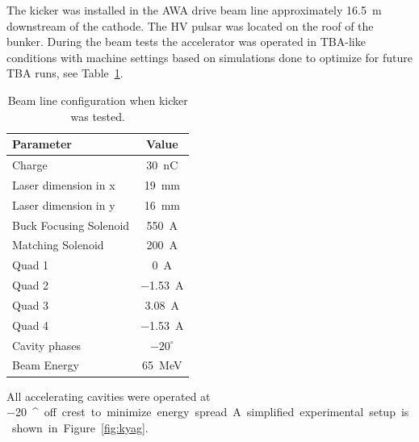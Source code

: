 \documentclass[aps,prab,preprint,groupedaddress,linenumbers]{revtex4-2}
\begin{document}
The kicker was installed in the AWA drive beam line approximately \SI{16.5}{m} downstream of the cathode.
The HV pulsar was located on the roof of the bunker.
During the beam tests the accelerator was operated in TBA-like conditions with machine settings based on simulations 
done to optimize for future TBA runs, see Table~\ref{tab:krunparam}.
\begin{table}%
	\begin{center}
		\caption{Beam line configuration when kicker was tested.}
		\label{tab:krunparam}
		\begin{tabular}{lc}
			\toprule
			\toprule
			\textbf{Parameter} 		&  \textbf{Value} \\ 
			\midrule
			Charge					&  \SI{30}{nC} \\
			Laser dimension in x    &  \SI{19}{mm} \\
			Laser dimension in y    &  \SI{16}{mm} \\
			Buck Focusing Solenoid	& \SI{550}{A} \\
			Matching Solenoid		& \SI{200}{A} \\
			Quad 1					& \SI{0}{A}  \\
			Quad 2					& \SI{-1.53}{A}  \\
			Quad 3					& \SI{3.08}{A}  \\
			Quad 4					& \SI{-1.53}{A}  \\
			Cavity phases   		& $-20^\circ$ \\
			Beam Energy 				& \SI{65}{MeV}\\ 
			\bottomrule
		\end{tabular}
	\end{center}
\end{table}
All accelerating cavities were operated at \SI{-20}{^\circ} off crest to minimize energy spread.
A simplified experimental setup is shown in Figure~\ref{fig:kyag}.
\end{document}
